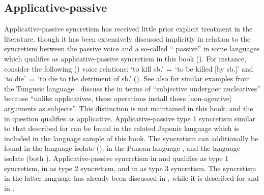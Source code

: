 \subsection{Applicative-passive} \label{sec:simple-syncretism:appl-pass}
Applicative-passive syncretism has received little prior explicit treatment in the literature, though it has been extensively discussed implicitly in relation to the syncretism between the passive voice and a so-called “ passive” in some languages which qualifies as applicative-passive syncretism in this book (). For instance, consider the following  () voice relations:  ‘to kill sb.’ ↔  ‘to be killed [by sb.]’ and  ‘to die’ ↔  ‘to die to the detriment of sb.’ (\citealt[244]{zuniga:kittila:2019}). See also \cite[608f.]{malchukov:nedjalkov:2015} for similar examples from the Tungusic language . \cite[81]{zuniga:kittila:2019} discuss the   in terms of “subjective undergoer nucleatives” because “unlike applicatives, these operations install these [non-agentive] arguments as subjects”. This distinction is not maintained in this book, and the   in question qualifies as applicative. Applicative-passive type 1 syncretism similar to that described for  can be found in the related Japonic language  which is included in the language sample of this book. The syncretism can additionally be found in the language isolate  (), in the Panoan language , and the language isolate  (both ). Applicative-passive syncretism in  and  qualifies as type 1 syncretism, in  as type 2 syncretism, and in  as type 3 syncretism. The syncretism in the latter language has already been discussed in , while it is described for  and  in . 

\newpage

